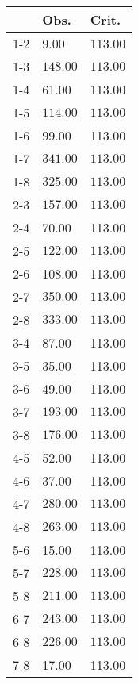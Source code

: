 \begin{table}[ht]
\centering
\begin{tabular}{rll}
  \hline
 & Obs. & Crit. \\ 
  \hline
1-2 & 9.00 & 113.00 \\ 
  1-3 & \(\mathbf{148.00}\) & \(\mathbf{113.00}\) \\ 
  1-4 & 61.00 & 113.00 \\ 
  1-5 & \(\mathbf{114.00}\) & \(\mathbf{113.00}\) \\ 
  1-6 & 99.00 & 113.00 \\ 
  1-7 & \(\mathbf{341.00}\) & \(\mathbf{113.00}\) \\ 
  1-8 & \(\mathbf{325.00}\) & \(\mathbf{113.00}\) \\ 
  2-3 & \(\mathbf{157.00}\) & \(\mathbf{113.00}\) \\ 
  2-4 & 70.00 & 113.00 \\ 
  2-5 & \(\mathbf{122.00}\) & \(\mathbf{113.00}\) \\ 
  2-6 & 108.00 & 113.00 \\ 
  2-7 & \(\mathbf{350.00}\) & \(\mathbf{113.00}\) \\ 
  2-8 & \(\mathbf{333.00}\) & \(\mathbf{113.00}\) \\ 
  3-4 & 87.00 & 113.00 \\ 
  3-5 & 35.00 & 113.00 \\ 
  3-6 & 49.00 & 113.00 \\ 
  3-7 & \(\mathbf{193.00}\) & \(\mathbf{113.00}\) \\ 
  3-8 & \(\mathbf{176.00}\) & \(\mathbf{113.00}\) \\ 
  4-5 & 52.00 & 113.00 \\ 
  4-6 & 37.00 & 113.00 \\ 
  4-7 & \(\mathbf{280.00}\) & \(\mathbf{113.00}\) \\ 
  4-8 & \(\mathbf{263.00}\) & \(\mathbf{113.00}\) \\ 
  5-6 & 15.00 & 113.00 \\ 
  5-7 & \(\mathbf{228.00}\) & \(\mathbf{113.00}\) \\ 
  5-8 & \(\mathbf{211.00}\) & \(\mathbf{113.00}\) \\ 
  6-7 & \(\mathbf{243.00}\) & \(\mathbf{113.00}\) \\ 
  6-8 & \(\mathbf{226.00}\) & \(\mathbf{113.00}\) \\ 
  7-8 & 17.00 & 113.00 \\ 
   \hline
\end{tabular}
\end{table}
